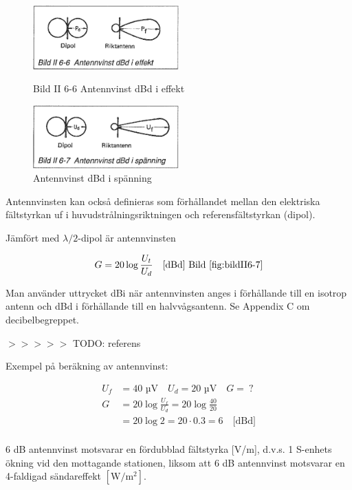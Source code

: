 \begin{figure}
  \includegraphics[width=0.5\textwidth]{images/bild_2_6-06}
  \caption{Bild II 6-6 Antennvinst dBd i effekt}
  \label{fig:bildII6-6}

  \includegraphics[width=0.5\textwidth]{images/bild_2_6-07}
  \caption{Antennvinst dBd i spänning}
  \label{fig:bildII6-7}
\end{figure}

Antennvinsten kan också definieras som förhållandet mellan den
elektriska fältstyrkan uf i huvudstrålningsriktningen och
referensfältstyrkan (dipol).

Jämfört med \(\lambda/2\)-dipol är antennvinsten

\[G = 20 \log\frac{U_t}{U_d} \quad \text{[dBd] Bild \ref{fig:bildII6-7}}\]

Man använder uttrycket dBi när antennvinsten anges i förhållande till
en isotrop antenn och dBd i förhållande till en halvvågsantenn.  Se
Appendix C om decibelbegreppet.

$>>>>>$ TODO: referens

Exempel på beräkning av antennvinst:

\begin{align*}
  U_f &= 40\text{ µV} \quad U_d = 20\text{ µV} \quad G =\ ? \\
  G &= 20 \log\frac{U_f}{U_d} = 20 \log\frac{40}{20} \\
  &= 20 \log 2 = 20\cdot 0.3 = 6 \quad \text{[dBd]} \\
\end{align*}

6 dB antennvinst motsvarar en fördubblad fältstyrka [V/m], d.v.s. 1
S-enhets ökning vid den mottagande stationen, liksom att 6 dB
antennvinst motsvarar en 4-faldigad sändareffekt \(\mathrm{[W/m^2]}\).

